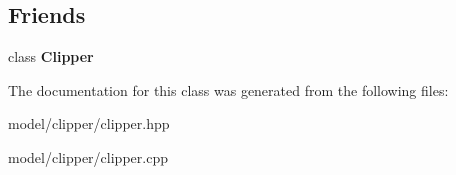 \subsection*{Friends}
\begin{DoxyCompactItemize}
\item 
\hypertarget{classClipperLib_1_1PolyNode_a4d39a09ecdddeeb85930dd4554a54b3c}{class {\bfseries Clipper}}\label{classClipperLib_1_1PolyNode_a4d39a09ecdddeeb85930dd4554a54b3c}

\end{DoxyCompactItemize}


The documentation for this class was generated from the following files\-:\begin{DoxyCompactItemize}
\item 
model/clipper/clipper.\-hpp\item 
model/clipper/clipper.\-cpp\end{DoxyCompactItemize}
